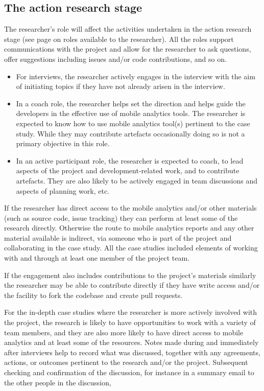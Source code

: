 \subsection{The action research stage}

The researcher's role will affect the activities undertaken in the action research stage (see page \pageref{section-evaluation-through-action-research-method} on roles available to the researcher). All the roles support communications with the project and allow for the researcher to ask questions, offer suggestions including issues and/or code contributions, and so on. 
\begin{itemize}
    \item For interviews, the researcher actively engages in the interview with the aim of initiating topics if they have not already arisen in the interview.
    \item In a coach role, the researcher helps set the direction and helps guide the developers in the effective use of mobile analytics tools. The researcher is expected to know how to use mobile analytics tool(s) pertinent to the case study. While they may contribute artefacts occasionally doing so is not a primary objective in this role.
    \item In an active participant role, the researcher is expected to coach, to lead aspects of the project and development-related work, and to contribute artefacts. They are also likely to be actively engaged in team discussions and aspects of planning work, etc. 
\end{itemize}

If the researcher has direct access to the mobile analytics and/or other materials (such as source code, issue tracking) they can perform at least some of the research directly. Otherwise the route to mobile analytics reports and any other material available is indirect, via someone who is part of the project and collaborating in the case study. All the case studies included elements of working with and through at least one member of the project team.

If the engagement also includes contributions to the project's materials similarly the researcher may be able to contribute directly if they have write access and/or the facility to fork the codebase and create pull requests.

For the in-depth case studies where the researcher is more actively involved with the project, the research is likely to have opportunities to work with a variety of team members, and they are also more likely to have direct access to mobile analytics and at least some of the resources. Notes made during and immediately after interviews help to record what was discussed, together with any agreements, actions, or outcomes pertinent to the research and/or the project. Subsequent checking and confirmation of the discussion, for instance in a summary email to the other people in the discussion, 

